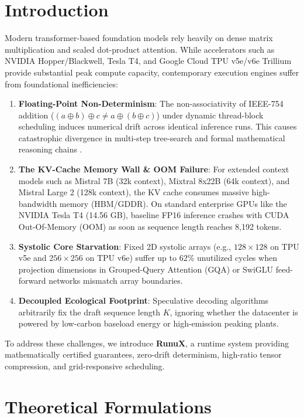 \documentclass[10pt,twocolumn]{article}
\begin{document}
\section{Introduction}

Modern transformer-based foundation models \cite{vaswani2017attention} rely heavily on dense matrix multiplication and scaled dot-product attention. While accelerators such as NVIDIA Hopper/Blackwell, Tesla T4, and Google Cloud TPU v5e/v6e Trillium provide substantial peak compute capacity, contemporary execution engines suffer from foundational inefficiencies:

\begin{enumerate}
    \item \textbf{Floating-Point Non-Determinism}: The non-associativity of IEEE-754 addition ($ (a \oplus b) \oplus c \neq a \oplus (b \oplus c) $) under dynamic thread-block scheduling induces numerical drift across identical inference runs. This causes catastrophic divergence in multi-step tree-search and formal mathematical reasoning chains \cite{dao2022flashattention}.
    \item \textbf{The KV-Cache Memory Wall \& OOM Failure}: For extended context models such as Mistral 7B (32k context), Mixtral 8x22B (64k context), and Mistral Large 2 (128k context), the KV cache consumes massive high-bandwidth memory (HBM/GDDR). On standard enterprise GPUs like the NVIDIA Tesla T4 (14.56 GB), baseline FP16 inference crashes with CUDA Out-Of-Memory (OOM) as soon as sequence length reaches 8,192 tokens.
    \item \textbf{Systolic Core Starvation}: Fixed 2D systolic arrays (e.g., $128 \times 128$ on TPU v5e and $256 \times 256$ on TPU v6e) suffer up to 62\% unutilized cycles when projection dimensions in Grouped-Query Attention (GQA) or SwiGLU feed-forward networks mismatch array boundaries.
    \item \textbf{Decoupled Ecological Footprint}: Speculative decoding algorithms arbitrarily fix the draft sequence length $K$, ignoring whether the datacenter is powered by low-carbon baseload energy or high-emission peaking plants.
\end{enumerate}

To address these challenges, we introduce \textbf{RunuX}, a runtime system providing mathematically certified guarantees, zero-drift determinism, high-ratio tensor compression, and grid-responsive scheduling.

\section{Theoretical Formulations}
\end{document}
